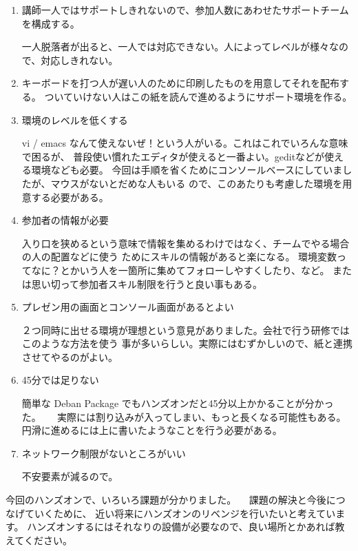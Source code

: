 \documentclass[mingoth,a4paper]{jsarticle}
\begin{document}
 \begin{enumerate}
   \item 講師一人ではサポートしきれないので、参加人数にあわせたサポートチームを構成する。

     一人脱落者が出ると、一人では対応できない。人によってレベルが様々なので、対応しきれない。

   \item キーボードを打つ人が遅い人のために印刷したものを用意してそれを配布する。
         ついていけない人はこの紙を読んで進めるようにサポート環境を作る。

   \item  環境のレベルを低くする
    
     vi / emacs なんて使えないぜ！という人がいる。これはこれでいろんな意味で困るが、
     普段使い慣れたエディタが使えると一番よい。geditなどが使える環境なども必要。
     今回は手順を省くためにコンソールベースにしていましたが、マウスがないとだめな人もいる
     ので、このあたりも考慮した環境を用意する必要がある。

   \item 参加者の情報が必要

     入り口を狭めるという意味で情報を集めるわけではなく、チームでやる場合の人の配置などに使う
     ためにスキルの情報があると楽になる。
     環境変数ってなに？とかいう人を一箇所に集めてフォローしやすくしたり、など。
     または思い切って参加者スキル制限を行うと良い事もある。
    
   \item プレゼン用の画面とコンソール画面があるとよい

      ２つ同時に出せる環境が理想という意見がありました。会社で行う研修ではこのような方法を使う
      事が多いらしい。実際にはむずかしいので、紙と連携させてやるのがよい。

   \item 45分では足りない

      簡単な Deban Package でもハンズオンだと45分以上かかることが分かった。
　     実際には割り込みが入ってしまい、もっと長くなる可能性もある。
      円滑に進めるには上に書いたようなことを行う必要がある。

   \item ネットワーク制限がないところがいい

      不安要素が減るので。 
     
  \end{enumerate}

 今回のハンズオンで、いろいろ課題が分かりました。
　課題の解決と今後につなげていくために、
 近い将来にハンズオンのリベンジを行いたいと考えています。
 ハンズオンするにはそれなりの設備が必要なので、良い場所とかあれば教えてください。
\end{document}
